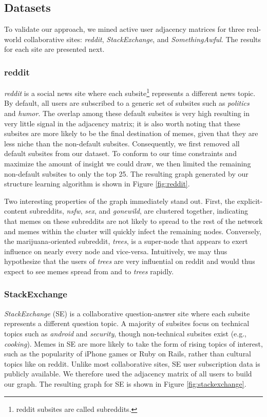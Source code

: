 \documentclass{article} %
\begin{document}
\subsection{Datasets}
To validate our approach, we mined active user adjacency matrices for three real-world collaborative sites: \textit{reddit}, \textit{StackExchange}, and \textit{SomethingAwful}. The results for each site are presented next.

\subsubsection{reddit}
\textit{reddit} is a social news site where each subsite\footnote{reddit subsites are called subreddits.} represents a different news topic. By default, all users are subscribed to a generic set of subsites such as \textit{politics} and \textit{humor}. The overlap among these default subsites is very high resulting in very little signal in the adjacency matrix; it is also worth noting that these subsites are more likely to be the final destination of memes, given that they are less niche than the non-default subsites. Consequently, we first removed all default subsites from our dataset. To conform to our time constraints and maximize the amount of insight we could draw, we then limited the remaining non-default subsites to only the top 25. The resulting graph generated by our structure learning algorithm is shown in Figure \ref{fig:reddit}.

Two interesting properties of the graph immediately stand out. First, the explicit-content subreddits, \textit{nsfw}, \textit{sex}, and \textit{gonewild}, are clustered together, indicating that memes on these subreddits are not likely to spread to the rest of the network and memes within the cluster will quickly infect the remaining nodes. Conversely, the marijuana-oriented subreddit, \textit{trees}, is a super-node that appears to exert influence on nearly every node and vice-versa. Intuitively, we may thus hypothesize that the users of \textit{trees} are very influential on reddit and would thus expect to see memes spread from and to \textit{trees} rapidly.

\subsubsection{StackExchange}
\textit{StackExchange} (SE) is a collaborative question-answer site where each subsite represents a different question topic. A majority of subsites focus on technical topics such as \textit{android} and \textit{security}, though non-technical subsites exist (e.g., \textit{cooking}). Memes in SE are more likely to take the form of rising topics of interest, such as the popularity of iPhone games or Ruby on Rails, rather than cultural topics like on reddit. Unlike most collaborative sites, SE user subscription data is publicly available. We therefore used the adjacency matrix of all users to build our graph. The resulting graph for SE is shown in Figure \ref{fig:stackexchange}.
\end{document}
